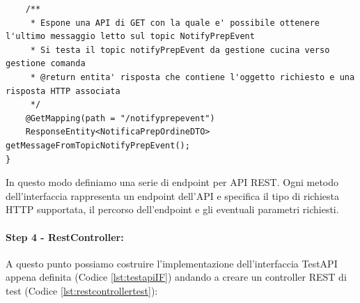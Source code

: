 \begin{lstlisting}
    /**
     * Espone una API di GET con la quale e' possibile ottenere l'ultimo messaggio letto sul topic NotifyPrepEvent
     * Si testa il topic notifyPrepEvent da gestione cucina verso gestione comanda
     * @return entita' risposta che contiene l'oggetto richiesto e una risposta HTTP associata
     */
    @GetMapping(path = "/notifyprepevent")
    ResponseEntity<NotificaPrepOrdineDTO> getMessageFromTopicNotifyPrepEvent();
}
\end{lstlisting}
In questo modo definiamo una serie di endpoint per API REST. Ogni metodo dell'interfaccia rappresenta un endpoint dell'API e specifica il tipo di richiesta HTTP supportata, il percorso dell'endpoint e gli eventuali parametri richiesti.
\paragraph{Step 4 - RestController:}
A questo punto possiamo costruire l'implementazione dell'interfaccia TestAPI appena definita (Codice \vref{lst:testapiIF}) andando a creare un controller REST di test (Codice \vref{lst:restcontrollertest}):
